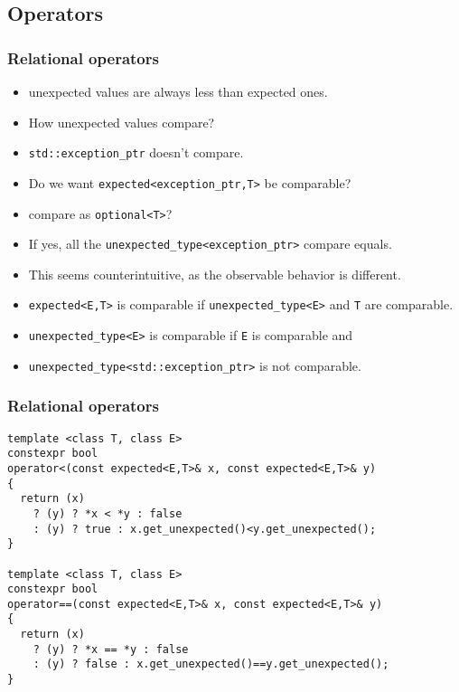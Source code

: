 \documentclass[xcolor=dvipsnames]{beamer}
\newcommand{\cpp}[1]{\lstinline{#1}}
\begin{document}
\subsection{Operators}
\begin{frame}[fragile]
\frametitle{Relational operators}

\begin{itemize}
\item unexpected values are always less than expected ones.
\item How unexpected values compare? 
\item \cpp{std::exception_ptr} doesn't compare.
\item Do we want \cpp{expected<exception_ptr,T>} be comparable?
\item compare as \cpp{optional<T>}?
\item If yes, all the \cpp{unexpected_type<exception_ptr>} compare equals.
\item This seems counterintuitive, as the observable behavior is different.

\item \cpp{expected<E,T>} is comparable if \cpp{unexpected_type<E>} and \cpp{T} are comparable.
\item \cpp{unexpected_type<E>} is comparable  if \cpp{E} is comparable and
\item \cpp{unexpected_type<std::exception_ptr>} is not comparable.
\end{itemize}

\end{frame}
\begin{frame}[fragile]
\frametitle{Relational operators}

\begin{lstlisting}
template <class T, class E>
constexpr bool 
operator<(const expected<E,T>& x, const expected<E,T>& y)
{
  return (x) 
    ? (y) ? *x < *y : false
    : (y) ? true : x.get_unexpected()<y.get_unexpected();
}

template <class T, class E>
constexpr bool 
operator==(const expected<E,T>& x, const expected<E,T>& y)
{
  return (x)
    ? (y) ? *x == *y : false
    : (y) ? false : x.get_unexpected()==y.get_unexpected();
}
\end{lstlisting}

\end{frame}
\end{document}
